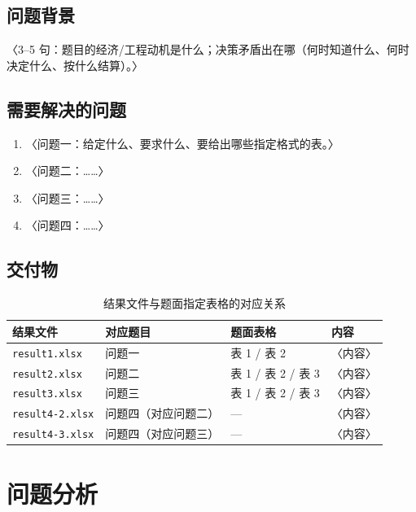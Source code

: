 \documentclass[12pt,a4paper]{ctexart}
\newif\ifwritemode
\newcommand{\guide}[1]{%
  \ifwritemode\par\noindent{\small\color{guideblue}\textbf{【写作提示】}#1}\par\fi}
\newcommand{\tabhead}[1]{\textbf{#1}}
\begin{document}
\subsection{问题背景}
〈3–5 句：题目的经济/工程动机是什么；决策矛盾出在哪（何时知道什么、何时决定什么、按什么结算）。〉

\subsection{需要解决的问题}
\begin{enumerate}
  \item 〈问题一：给定什么、要求什么、要给出哪些指定格式的表。〉
  \item 〈问题二：……〉
  \item 〈问题三：……〉
  \item 〈问题四：……〉
\end{enumerate}

\subsection{交付物}
\begin{table}[htbp]\centering\small
  \caption{结果文件与题面指定表格的对应关系}\label{tab:deliverable}
  \begin{tabular}{llll}
    \toprule
    \tabhead{结果文件} & \tabhead{对应题目} & \tabhead{题面表格} & \tabhead{内容} \\
    \midrule
    \texttt{result1.xlsx} & 问题一 & 表 1 / 表 2 & 〈内容〉 \\
    \texttt{result2.xlsx} & 问题二 & 表 1 / 表 2 / 表 3 & 〈内容〉 \\
    \texttt{result3.xlsx} & 问题三 & 表 1 / 表 2 / 表 3 & 〈内容〉 \\
    \texttt{result4-2.xlsx} & 问题四（对应问题二） & — & 〈内容〉 \\
    \texttt{result4-3.xlsx} & 问题四（对应问题三） & — & 〈内容〉 \\
    \bottomrule
  \end{tabular}
\end{table}

\section{问题分析}\label{sec:analysis}
\guide{全篇最重要的「锚」在这里。2.1 的诊断表是全篇统一性的合法性来源；2.3 那句「两个开关」决定后三问的建模部分能写多短。}
\end{document}
